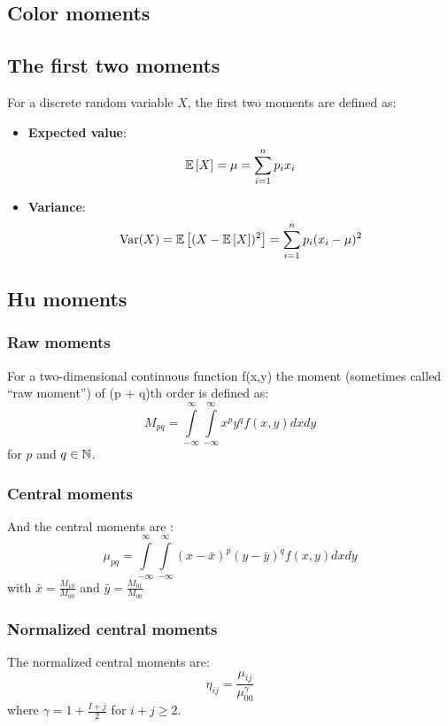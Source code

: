 \subsection{Color moments}

\subsection{The first two moments}

For a discrete random variable $X$, the first two moments are defined as:
\begin{itemize}
    \item \textbf{Expected value}: $$\mathbb{E} \left[ X \right] = \mu = \sum_{i = 1}^{n} p_i x_i $$
    \item \textbf{Variance}:  $$ \operatorname{Var} (X)= \mathbb{E} \left[ (X - \mathbb{E} \left[ X \right] )^2 \right] =\sum _{i=1}^{n} p_i (x_{i} - \mu )^{2} $$
\end{itemize}

\subsection{Hu moments}

\subsubsection{Raw moments}

For a two-dimensional continuous function f(x,y) the moment (sometimes called \enquote{raw moment}) of (p + q)th order is defined as: 
$$ M_{pq}=\int \limits _{-\infty }^{\infty }\int \limits _{-\infty }^{\infty }x^{p}y^{q}f(x,y) dx dy $$
for $p$ and $q \in \mathbb{N} $.

\subsubsection{Central moments}

And the central moments are :
$$\mu_{pq}=\int \limits_{-\infty }^{\infty }\int \limits _{-\infty}^{\infty} (x- \bar{x})^{p}(y - \bar{y})^{q} f(x,y) dx dy $$
with $\bar{x}=\frac{M_{10}}{M_{00}}$ and $\bar{y}=\frac{M_{01}}{M_{00}}$

\subsubsection{Normalized central moments}

The normalized central moments are:
$$ \eta_{ij}=\frac{\mu _{ij}}{\mu_{00}^{\gamma}} $$
where $\gamma = 1 + \frac{I + j}{2}$ for $i + j \geq 2$.

